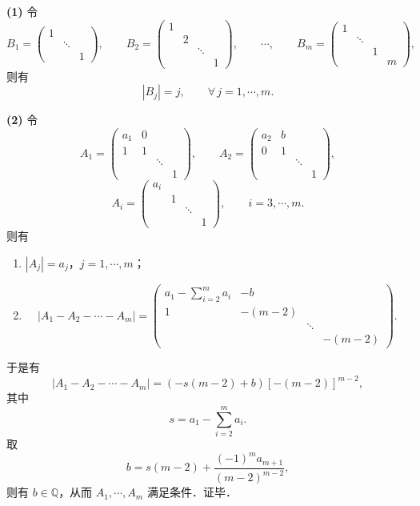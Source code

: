 \begin{solution}
\textbf{(1)} 令
\[
  B_1=\begin{pmatrix}1& & \\ & \ddots & \\ & & 1\end{pmatrix},\qquad
  B_2=\begin{pmatrix}1& & & \\ & 2 & & \\ & & \ddots & \\ & & & 1\end{pmatrix},\qquad
  \cdots,\qquad
  B_m=\begin{pmatrix}1& & & \\ & \ddots & & \\ & & 1 & \\ & & & m\end{pmatrix},
\]
则有
\[
  |B_j|=j,\qquad \forall\, j=1,\cdots,m.
\]

\textbf{(2)} 令
\[
  A_1=\begin{pmatrix}a_1 & 0 & & \\ 1 & 1 & & \\ & & \ddots & \\ & & & 1\end{pmatrix},\qquad
  A_2=\begin{pmatrix}a_2 & b & & \\ 0 & 1 & & \\ & & \ddots & \\ & & & 1\end{pmatrix},
\]
\[
  A_i=\begin{pmatrix}a_i & & & \\ & 1 & & \\ & & \ddots & \\ & & & 1\end{pmatrix},\qquad i=3,\cdots,m.
\]
则有
\begin{enumerate}[label=(\roman*)]
  \item $|A_j|=a_j$，$j=1,\cdots,m$；
  \item 
  \[
    |A_1-A_2-\cdots-A_m|=
    \begin{pmatrix}
      a_1-\sum\limits_{i=2}^{m}a_i & -b & & \\
      1 & -(m-2) & & \\
      & & \ddots & \\
      & & & -(m-2)
    \end{pmatrix}.
  \]
\end{enumerate}
于是有
\[
  |A_1-A_2-\cdots-A_m|=\left(-s(m-2)+b\right)[-(m-2)]^{m-2},
\]
其中
\[
  s=a_1-\sum_{i=2}^{m}a_i.
\]
取
\[
  b=s(m-2)+\frac{(-1)^ma_{m+1}}{(m-2)^{m-2}},
\]
则有 $b\in\mathbb{Q}$，从而 $A_1,\cdots,A_m$ 满足条件．证毕．
\end{solution}

